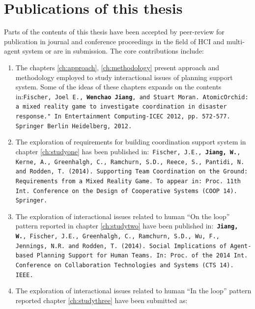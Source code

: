 \section{Publications of this thesis} 
Parts of the contents of this thesis have been accepted by peer-review for publication in journal and conference proceedings in the field of \ac{HCI} and multi-agent system or are in submission. The core contributions include: \\


\begin{enumerate}
\item The chapters \ref{ch:approach}, \ref{ch:methodology}  present approach and methodology employed to study interactional issues of planning support system. Some of the ideas of these chapters expands on the contents in:\texttt{Fischer, Joel E., \textbf{Wenchao Jiang}, and Stuart Moran. AtomicOrchid: a mixed reality game to investigate coordination in disaster response." In Entertainment Computing-ICEC 2012, pp. 572-577. Springer Berlin Heidelberg, 2012.}\\

\item The exploration of requirements for building coordination support system in chapter \ref{ch:studyone}  has been published in:\texttt{ Fischer, J.E., \textbf{Jiang, W.}, Kerne, A., Greenhalgh, C., Ramchurn, S.D., Reece, S., Pantidi, N. and Rodden, T. (2014). Supporting Team Coordination on the Ground: Requirements from a Mixed Reality Game. To appear in: Proc. 11th Int. Conference on the Design of Cooperative Systems (COOP 14). Springer.}\\


\item The exploration of interactional issues related to human ``On the loop'' pattern reported in chapter \ref{ch:studytwo} have been published in:\texttt{ \textbf{Jiang, W.}, Fischer, J.E., Greenhalgh, C., Ramchurn, S.D., Wu, F., Jennings, N.R. and Rodden, T. (2014). Social Implications of Agent-based Planning Support for Human Teams.  In: Proc. of the 2014 Int. Conference on Collaboration Technologies and Systems (CTS 14). IEEE.}

\item The exploration of interactional issues related to human ``In the loop'' pattern reported chapter \ref{ch:studythree} have been submitted as:\\



\end{enumerate}

